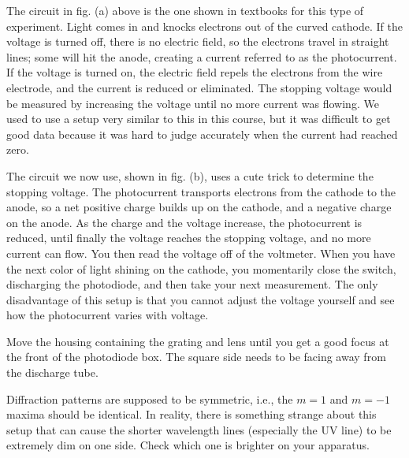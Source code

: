 

The circuit in fig. (a) above is the one shown in textbooks
for this type of experiment. Light comes in and knocks
electrons out of the curved cathode. If the voltage is
turned off, there is no electric field, so the electrons
travel in straight lines; some will hit the anode, creating
a current referred to as the photocurrent. If the voltage is
turned on, the electric field repels the electrons from the
wire electrode, and the current is reduced or eliminated.
The stopping voltage would be measured by increasing the
voltage until no more current was flowing. We used to use a
setup very similar to this in this course, but it was
difficult to get good data because it was hard to judge
accurately when the current had reached zero.

The circuit we now use, shown in fig. (b), uses a cute trick
to determine the stopping voltage. The photocurrent
transports electrons from the cathode to the anode, so a net
positive charge builds up on the cathode, and a negative
charge on the anode.  As the charge and the
voltage increase, the photocurrent is reduced, until finally
the voltage reaches the stopping voltage, and no more
current can flow. You then read the voltage off of the
voltmeter. When you have the next color of light shining on
the cathode, you momentarily close the switch, discharging
the photodiode, and then take your next measurement. The
only disadvantage of this setup is that you cannot adjust
the voltage yourself and see how the photocurrent varies with voltage.

\setup

Move the housing containing the grating and lens until you
get a good focus at the front of the photodiode box. The
square side needs to be facing away from the discharge tube.

Diffraction patterns are supposed to be symmetric, i.e., the $m=1$
and $m=-1$ maxima should be identical. In reality, there is something
strange about this setup that can cause the shorter wavelength lines
(especially the UV line) to be extremely dim on one side. Check which
one is brighter on your apparatus.

